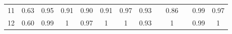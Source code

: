 \documentclass[twoside,11pt]{article}
\begin{document}
\begin{table}[H]
{\begin{tabular}{cccccccclclcc}
\multicolumn{1}{|c|}{11}                                                                          & \multicolumn{1}{c|}{0.63}                                                           & \multicolumn{1}{c|}{\cellcolor[HTML]{ECF4FF}0.95}                                              & \multicolumn{1}{c|}{0.91}                                                                & \multicolumn{1}{c|}{0.90}                                                                & \multicolumn{1}{c|}{0.91}                                                                & \multicolumn{1}{c|}{\cellcolor[HTML]{FFCCC9}0.97}                                           & \multicolumn{1}{c|}{0.93}                                                                   & \multicolumn{1}{l|}{}                                                                          & \multicolumn{1}{c|}{0.86}                                                                   & \multicolumn{1}{l|}{}                    & \multicolumn{1}{c|}{0.99}                                                                      & \multicolumn{1}{c|}{0.97}                                                                      \\ \cline{1-1}
\multicolumn{1}{|c|}{12}                                                                          & \multicolumn{1}{c|}{0.60}                                                           & \multicolumn{1}{c|}{\cellcolor[HTML]{ECF4FF}0.99}                                              & \multicolumn{1}{c|}{1}                                                                   & \multicolumn{1}{c|}{0.97}                                                                & \multicolumn{1}{c|}{\cellcolor[HTML]{FFCCC9}1}                                           & \multicolumn{1}{c|}{\cellcolor[HTML]{FFCCC9}1}                                              & \multicolumn{1}{c|}{0.93}                                                                   & \multicolumn{1}{l|}{}                                                                          & \multicolumn{1}{c|}{\cellcolor[HTML]{FFCCC9}1}                                              & \multicolumn{1}{l|}{}                    & \multicolumn{1}{c|}{0.99}                                                                      & \multicolumn{1}{c|}{1}                                                                         \\ \cline{1-1}

\end{tabular}}
\end{table}
\end{document}
